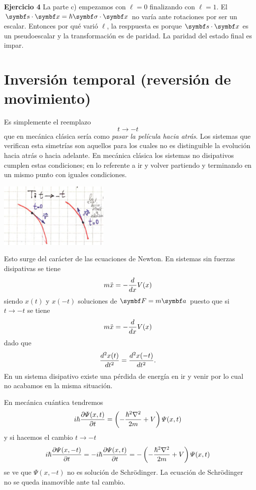 \documentclass[10pt,oneside]{CBFT_book}
\begin{document}
\begin{ejemplo}{\bf Ejercicio 4}
La parte c) empezamos con $\ell=0$ finalizando con $\ell=1$. El $\pe{s}{x} = \hbar  \pe{\sigma}{x}$ 
no varía ante rotaciones por ser un escalar. 
Entonces por qué varió $\ell$, la resppuesta es porque $\pe{s}{x}$ es un pseudoescalar y la transformación
es de paridad. La paridad del estado final es impar.

 
\end{ejemplo}



\section{Inversión temporal (reversión de movimiento)}

Es simplemente el reemplazo
\[
	t \longrightarrow -t
\]
que en mecánica clásica sería como {\it pasar la película hacia atrás}. Los sistemas que verifican
esta simetrías son aquellos para los cuales no es distinguible la evolución hacia atrás o hacia adelante.
En mecánica clásica los sistemas no disipativos cumplen estas condiciones; en lo referente a ir y volver
partiendo y terminando en un mismo punto con iguales condiciones.

\includegraphics[width=0.4\textwidth]{images/fig_ft2_temporal_1.jpg}

Esto surge del carácter de las ecuaciones de Newton. 
En sistemas sin fuerzas disipativas se tiene 
\[
	m \ddot{x} = - \dtot{}{x} V(x)
\]
siendo $x(t)$ y $x(-t)$ soluciones de $\vb{F} = m\vb{a}$ puesto que si $t\to-t$ se tiene
\[
	m \ddot{x} = - \dtot{}{x} V(x)
\]
dado que 
\[
	\dtot[2]{x(t)}{t} = \dtot[2]{x(-t)}{t}.
\]
En un sistema disipativo existe una pérdida de energía en ir y venir por lo cual no acabamos en la
misma situación.

En mecánica cuántica tendremos 
\[
	i \hbar \dpar{\Psi(x,t)}{t} = \left( -\frac{\hbar^2\nabla^2}{2m} + V \right)\Psi(x,t)
\]
y si hacemos el cambio $t\to -t$
\[
	i \hbar \dpar{\Psi(x,-t)}{t} = -i \hbar \dpar{\Psi(x,t)}{t}  = 
	- \left( -\frac{\hbar^2\nabla^2}{2m} + V \right)\Psi(x,t)
\]
se ve que $\Psi(x,-t)$ no es solución de Schrödinger. La ecuación de Schrödinger no se queda
inamovible ante tal cambio.
\end{document}
